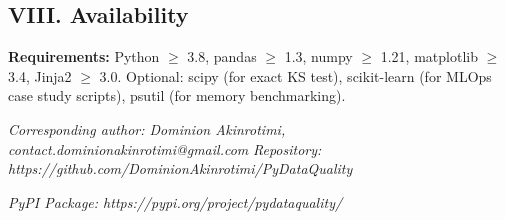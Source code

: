 \documentclass{article}
\begin{document}
\subsection{VIII. Availability}\label{viii.-availability}

\textbf{Requirements:} Python $\geq$ 3.8, pandas $\geq$ 1.3, numpy $\geq$ 1.21,
matplotlib $\geq$ 3.4, Jinja2 $\geq$ 3.0. Optional: scipy (for exact KS test),
scikit-learn (for MLOps case study scripts), psutil (for memory
benchmarking).

\emph{\hfill\break
Corresponding author: Dominion Akinrotimi,
contact.dominionakinrotimi@gmail.com} \emph{Repository:
https://github.com/DominionAkinrotimi/PyDataQuality}

\emph{PyPI Package: https://pypi.org/project/pydataquality/}
\end{document}
